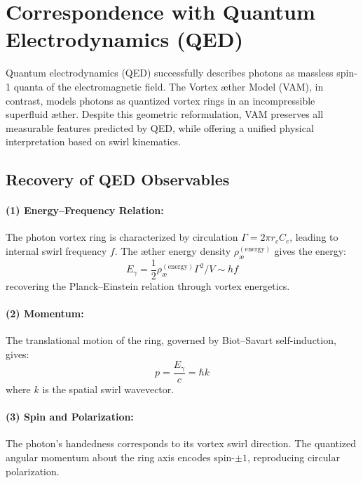 \section{Correspondence with Quantum Electrodynamics (QED)}\label{sec:qed-correspondence}

Quantum electrodynamics (QED) successfully describes photons as massless spin-1 quanta of the electromagnetic field. The Vortex \ae ther Model (VAM), in contrast, models photons as quantized vortex rings in an incompressible superfluid \ae ther. Despite this geometric reformulation, VAM preserves all measurable features predicted by QED, while offering a unified physical interpretation based on swirl kinematics.

\subsection{Recovery of QED Observables}

\paragraph{(1) Energy–Frequency Relation:}
The photon vortex ring is characterized by circulation $\Gamma = 2\pi r_c C_e$, leading to internal swirl frequency $f$. The æther energy density $\rho_\text{\ae}^{(\text{energy})}$ gives the energy:
\begin{equation}
    E_\gamma = \frac{1}{2} \rho_\text{\ae}^{(\text{energy})} \Gamma^2 / V \sim h f
\end{equation}
recovering the Planck–Einstein relation through vortex energetics.

\paragraph{(2) Momentum:}
The translational motion of the ring, governed by Biot--Savart self-induction, gives:
\begin{equation}
    p = \frac{E_\gamma}{c} = \hbar k
\end{equation}
where $k$ is the spatial swirl wavevector.

\paragraph{(3) Spin and Polarization:}
The photon's handedness corresponds to its vortex swirl direction. The quantized angular momentum about the ring axis encodes spin-$\pm1$, reproducing circular polarization.

